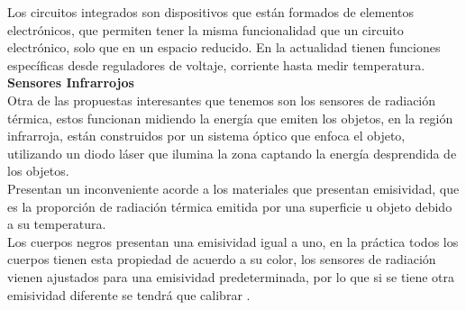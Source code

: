 Los circuitos integrados son dispositivos que están formados de elementos electrónicos, que permiten tener la misma funcionalidad que un circuito electrónico, solo que en un espacio reducido. En la actualidad tienen funciones específicas desde reguladores de voltaje, corriente hasta medir temperatura. \\

\textbf{Sensores Infrarrojos} \\

Otra de las propuestas interesantes que tenemos son los sensores de radiación térmica, estos funcionan midiendo la energía que emiten los objetos, en la región infrarroja, están construidos por un sistema óptico que enfoca el objeto, utilizando un diodo láser que ilumina la zona captando la energía desprendida de los objetos. \\

Presentan un inconveniente acorde a los materiales que presentan emisividad, que es la proporción de radiación térmica emitida por una superficie u objeto debido a su temperatura. \\

Los cuerpos negros presentan una emisividad igual a uno, en la práctica todos los cuerpos tienen esta propiedad de acuerdo a su color, los sensores de radiación vienen ajustados para una emisividad predeterminada, por lo que si se tiene otra emisividad diferente se tendrá que calibrar \cite{diecinueve}. \\










